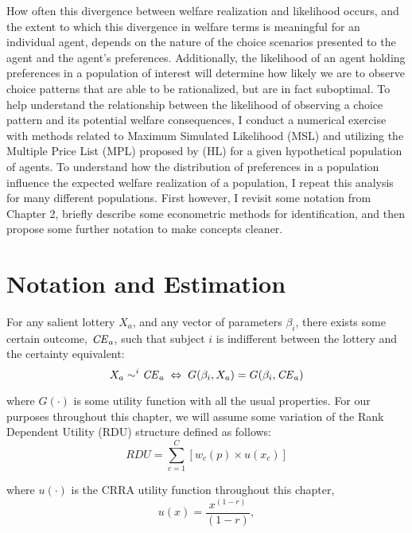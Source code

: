 \documentclass[../main.tex]{subfiles}
\begin{document}
How often this divergence between welfare realization and likelihood occurs, and the extent to which this divergence in welfare terms is meaningful for an individual agent, depends on the nature of the choice scenarios presented to the agent and the agent's preferences.
Additionally, the likelihood of an agent holding preferences in a population of interest will determine how likely we are to observe choice patterns that are able to be rationalized, but are in fact suboptimal.
To help understand the relationship between the likelihood of observing a choice pattern and its potential welfare consequences, I conduct a numerical exercise with methods related to Maximum Simulated Likelihood (MSL) and utilizing the Multiple Price List (MPL) proposed by \textcite{Holt2002} (HL) for a given hypothetical population of agents.
To understand how the distribution of preferences in a population influence the expected welfare realization of a population, I repeat this analysis for many different populations.
First however, I revisit some notation from Chapter 2, briefly describe some econometric methods for identification, and then propose some further notation to make concepts cleaner.

\section{Notation and Estimation} \label{ssec:Notation}

For any salient lottery $X_a$, and any vector of parameters $\beta_i$, there exists some certain outcome, $\mathit{CE}_a$, such that subject $i$ is indifferent between the lottery and the certainty equivalent:
\begin{equation}
	\label{eq3:CE.indiff}
	X_a \sim^i {\mathit{CE}}_a \;\Leftrightarrow\; G(\beta_i,X_a) = G(\beta_i, {\mathit{CE}}_a)
\end{equation}

\noindent where $G(\cdot)$ is some utility function with all the usual properties.
For our purposes throughout this chapter, we will assume some variation of the Rank Dependent Utility (RDU) structure defined as follows:
\begin{equation}
	\label{eq3:RDU}
	RDU = \sum_{c=1}^{C} \left[ w_c(p) \times u(x_c) \right]
\end{equation}

\noindent where $u(\cdot)$ is the CRRA utility function throughout this chapter,
\begin{equation}
	\label{eq3:CRRA}
	u(x) = \frac{x^{(1-r)}}{(1-r)} ,
\end{equation}
\end{document}
